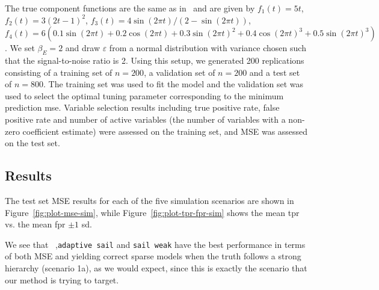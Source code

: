 The true component functions are the same as in~\citep{lin2006component,huang2010variable} and are given by $f_1(t) = 5t$, $f_2(t) = 3(2t-1)^2$, $f_3(t) = 4\sin(2\pi t) / (2-\sin(2\pi t))$, $f_4(t) = 6(0.1\sin(2\pi t) + 0.2 \cos(2\pi t)  + 0.3 \sin(2\pi t)^2 + 0.4\cos(2\pi t)^3+0.5\sin(2\pi t)^3)$. We set $\beta_E = 2$ and draw $\varepsilon$ from a normal distribution with variance chosen such that the signal-to-noise ratio is 2. Using this setup, we generated 200 replications consisting of a training set of $n=200$, a validation set of $n=200$ and a test set of $n=800$. The training set was used to fit the model and the validation set was used to select the optimal tuning parameter corresponding to the minimum prediction \ac{mse}. Variable selection results including true positive rate, false positive rate and number of active variables (the number of variables with a non-zero coefficient estimate) were assessed on the training set, and MSE was assessed on the test set. %


\subsection{Results}

The test set MSE results for each of the five simulation scenarios are shown in Figure~\ref{fig:plot-mse-sim}, while Figure~\ref{fig:plot-tpr-fpr-sim} shows the mean \ac{tpr} vs. the mean \ac{fpr} $\pm 1$ \ac{sd}. 




We see that \sail~,\texttt{adaptive sail} and \texttt{sail weak} have the best performance in terms of both MSE and yielding correct sparse models when the truth follows a strong hierarchy (scenario 1a), as we would expect, since this is exactly the scenario that our method is trying to target. 

